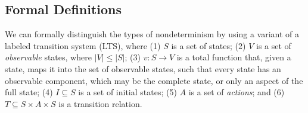 \subsection{Formal Definitions}
\label{sec:formal}

We can formally distinguish the types of nondeterminism by using a
variant of a labeled transition system (LTS), where (1) $S$
is a set of states; (2) $V$ is a set of \emph{observable} states, where
$|V| \leq |S|$; (3) $v: S \rightarrow V$ is a total function that, given a state, maps it
  into the set of observable states, such that every state has an observable
  component, which may be the complete state, or only an aspect of the
  full state; (4)  $I \subseteq S$ is a set of initial states; (5) $A$
  is a set of \emph{actions}; and (6) $T \subseteq S \times A \times S$ is a transition relation.


